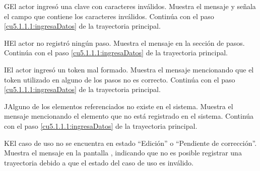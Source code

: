  \begin{UCtrayectoriaA}{G}{El actor ingresó una clave con caracteres inválidos.}
    \UCpaso[\UCsist] Muestra el mensaje  y señala el campo que contiene los caracteres inválidos.
    \UCpaso[] Continúa con el paso \ref{cu5.1.1.1:ingresaDatos} de la trayectoria principal.
 \end{UCtrayectoriaA}
 \begin{UCtrayectoriaA}{H}{El actor no registró ningún paso.}
    \UCpaso[\UCsist] Muestra el mensaje  en la sección de pasos.
    \UCpaso[] Continúa con el paso \ref{cu5.1.1.1:ingresaDatos} de la trayectoria principal.
 \end{UCtrayectoriaA}
 \begin{UCtrayectoriaA}{I}{El actor ingresó un token mal formado.}
    \UCpaso[\UCsist] Muestra el mensaje  mencionando que el token utilizado en alguno de los pasos no es correcto.
    \UCpaso[] Continúa con el paso \ref{cu5.1.1.1:ingresaDatos} de la trayectoria principal.
 \end{UCtrayectoriaA}
 \begin{UCtrayectoriaA}{J}{Alguno de los elementos referenciados no existe en el sistema.}
    \UCpaso[\UCsist] Muestra el mensaje  mencionando el elemento que no está registrado en el sistema.
    \UCpaso[] Continúa con el paso \ref{cu5.1.1.1:ingresaDatos} de la trayectoria principal.
 \end{UCtrayectoriaA}
 \begin{UCtrayectoriaA}{K}{El caso de uso no se encuentra en estado ``Edición'' o ``Pendiente de corrección''.}
    \UCpaso[\UCsist] Muestra el mensaje  en la pantalla , indicando que no es posible registrar una trayectoria debido a que el estado del caso de uso es inválido.
 \end{UCtrayectoriaA}
 

